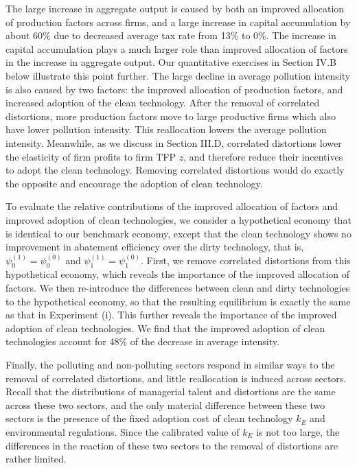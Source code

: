 \documentclass[AEJ]{AEA}
\begin{document}
The large increase in aggregate output is caused by both an improved allocation of production factors across firms, and a large increase in capital accumulation by about 60\% due to decreased average tax rate from 13\% to 0\%. The increase in capital accumulation plays a much larger role than improved allocation of factors in the increase in aggregate output. Our quantitative exercises in Section IV.B below illustrate this point further. The large decline in average pollution intensity is also caused by two factors: the improved allocation of production factors, and increased adoption of the clean technology. After the removal of correlated distortions, more production factors move to large productive firms which also have lower pollution intensity. This reallocation lowers the average pollution intensity. Meanwhile, as we discuss in Section III.D, correlated distortions lower the elasticity of firm profits to firm TFP $z$, and therefore reduce their incentives to adopt the clean technology. Removing correlated distortions would do exactly the opposite and encourage the adoption of clean technology.

To evaluate the relative contributions of the improved allocation of factors and improved adoption of clean technologies, we consider a hypothetical economy that is identical to our benchmark economy, except that the clean technology shows no improvement in abatement efficiency over the dirty technology, that is, $\psi_0^{(1)} = \psi_0^{(0)}$ and $\psi_1^{(1)} = \psi_1^{(0)}$. First, we remove correlated distortions from this hypothetical economy, which reveals the importance of the improved allocation of factors. We then re-introduce the differences between clean and dirty technologies to the hypothetical economy, so that the resulting equilibrium is exactly the same as that in Experiment (i). This further reveals the importance of the improved adoption of clean technologies. We find that the improved adoption of clean technologies account for 48\% of the decrease in average intensity.

Finally, the polluting and non-polluting sectors respond in similar ways to the removal of correlated distortions, and little reallocation is induced across sectors. Recall that the distributions of managerial talent and distortions are the same across these two sectors, and the only material difference between these two sectors is the presence of the fixed adoption cost of clean technology $k_E$ and environmental regulations. Since the calibrated value of $k_E$ is not too large, the differences in the reaction of these two sectors to the removal of distortions are rather limited.
\end{document}
